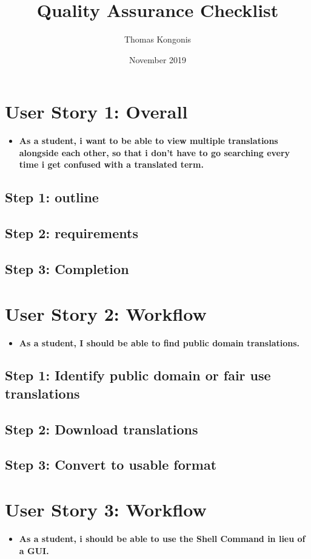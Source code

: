 \documentclass{article}
\title{Quality Assurance Checklist}
\author{Thomas Kongonis}
\date{November 2019}
\begin{document}
\maketitle
\tableofcontents

\vspace{10mm}

\section{User Story 1: Overall}
\begin{itemize}
\item{\textbf{As a student, i want to be able to view multiple  translations alongside each other, so that i don’t have to go searching every time i get confused with a translated term.}} 
\end{itemize}
\subsection{Step 1: outline}
\subsection{Step 2: requirements}
\subsection{Step 3: Completion}


\section{User Story 2: Workflow}
\begin{itemize}
\item{\textbf{As a student, I should be able to find public domain translations.}}
\end{itemize}
\subsection{Step 1: Identify public domain or fair use translations}
\subsection{Step 2: Download translations}
\subsection{Step 3: Convert to usable format}


\section{User Story 3: Workflow}
\begin{itemize}
\item{\textbf{As a student, i should be able to use the Shell Command in lieu of a GUI.}}
\end{itemize}
\end{document}
